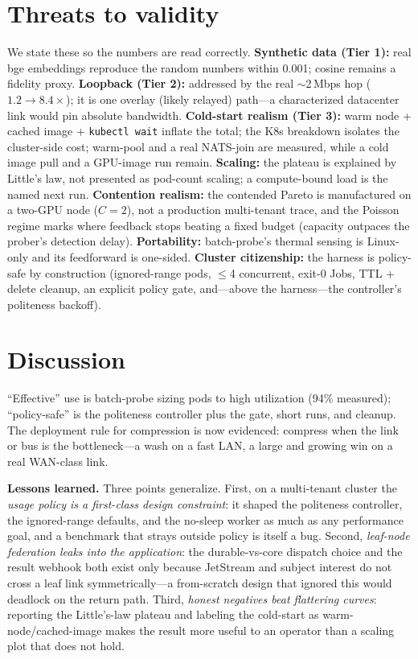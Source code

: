 \documentclass[conference]{IEEEtran}
\begin{document}
\section{Threats to validity}\label{sec:threats}
We state these so the numbers are read correctly. \textbf{Synthetic data (Tier 1):} real bge
embeddings reproduce the random numbers within 0.001; cosine remains a fidelity proxy.
\textbf{Loopback (Tier 2):} addressed by the real $\sim$2\,Mbps hop ($1.2\!\to\!8.4\times$); it is
one overlay (likely relayed) path---a characterized datacenter link would pin absolute bandwidth.
\textbf{Cold-start realism (Tier 3):} warm node + cached image + \texttt{kubectl wait} inflate the
total; the K8s breakdown isolates the cluster-side cost; warm-pool and a real NATS-join are
measured, while a cold image pull and a GPU-image run remain. \textbf{Scaling:} the plateau is
explained by Little's law, not presented as pod-count scaling; a compute-bound load is the named
next run. \textbf{Contention realism:} the contended Pareto is manufactured on a two-GPU node
($C{=}2$), not a production multi-tenant trace, and the Poisson regime marks where feedback stops
beating a fixed budget (capacity outpaces the prober's detection delay). \textbf{Portability:}
batch-probe's thermal sensing is Linux-only and its feedforward is one-sided. \textbf{Cluster citizenship:} the
harness is policy-safe by construction (ignored-range pods, $\le$4 concurrent, exit-0 Jobs, TTL +
delete cleanup, an explicit policy gate, and---above the harness---the controller's politeness
backoff).

\section{Discussion}\label{sec:discussion}
``Effective'' use is batch-probe sizing pods to high utilization (94\% measured); ``policy-safe''
is the politeness controller plus the gate, short runs, and cleanup. The deployment rule for
compression is now evidenced: compress when the link or bus is the bottleneck---a wash on a fast
LAN, a large and growing win on a real WAN-class link.

\textbf{Lessons learned.} Three points generalize. First, on a multi-tenant cluster the
\emph{usage policy is a first-class design constraint}: it shaped the politeness controller, the
ignored-range defaults, and the no-sleep worker as much as any performance goal, and a benchmark
that strays outside policy is itself a bug. Second, \emph{leaf-node federation leaks into the
application}: the durable-vs-core dispatch choice and the result webhook both exist only because
JetStream and subject interest do not cross a leaf link symmetrically---a from-scratch design that
ignored this would deadlock on the return path. Third, \emph{honest negatives beat flattering
curves}: reporting the Little's-law plateau and labeling the cold-start as warm-node/cached-image
makes the result more useful to an operator than a scaling plot that does not hold.
\end{document}
